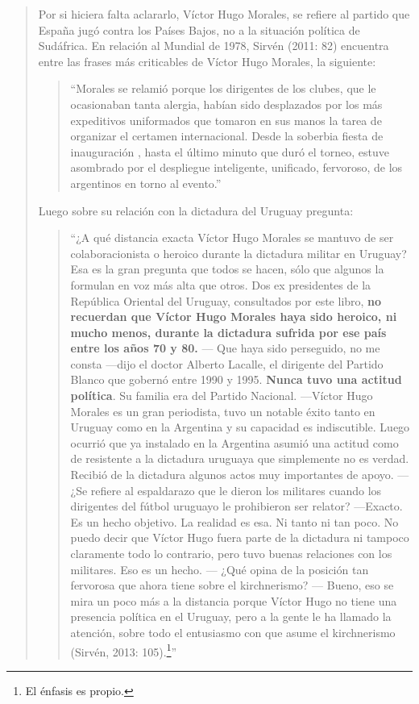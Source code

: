 \begin{quote}
Por si hiciera falta aclararlo, Víctor Hugo Morales, se refiere al partido que España jugó contra los Países Bajos, no a la situación política de Sudáfrica. En relación al Mundial de 1978, Sirvén (2011: 82) encuentra entre las frases más criticables de Víctor Hugo Morales, la siguiente:

\begin{quote}
	\enquote{Morales se relamió porque los dirigentes de los clubes, que le ocasionaban tanta alergia, habían sido desplazados por los más expeditivos uniformados que tomaron en sus manos la tarea de organizar el certamen internacional. Desde la soberbia fiesta de inauguración , hasta el último minuto que duró el torneo, estuve asombrado por el despliegue inteligente, unificado, fervoroso, de los argentinos en torno al evento.}
\end{quote}


Luego sobre su relación con la dictadura del Uruguay pregunta:

\begin{quote}
	\enquote{¿A qué distancia exacta Víctor Hugo Morales se mantuvo de ser colaboracionista o heroico durante la dictadura militar en Uruguay? Esa es la gran pregunta que todos se hacen, sólo que algunos la formulan en voz más alta que otros. Dos ex presidentes de la República Oriental del Uruguay, consultados por este libro, \textbf{no recuerdan que Víctor Hugo Morales haya sido heroico, ni mucho menos, durante la dictadura sufrida por ese país entre los años 70 y 80.} --- Que haya sido perseguido, no me consta ---dijo el doctor Alberto Lacalle, el dirigente del Partido Blanco que gobernó entre 1990 y 1995. \textbf{Nunca tuvo una actitud política}. Su familia era del Partido Nacional. ---Víctor Hugo Morales es un gran periodista, tuvo un notable éxito tanto en Uruguay como en la Argentina y su capacidad es indiscutible. Luego ocurrió que ya instalado en la Argentina asumió una actitud como de resistente a la dictadura uruguaya que simplemente no es verdad. Recibió de la dictadura algunos actos muy importantes de apoyo. --- ¿Se refiere al espaldarazo que le dieron los militares cuando los dirigentes del fútbol uruguayo le prohibieron ser relator? ---Exacto. Es un hecho objetivo. La realidad es esa. Ni tanto ni tan poco. No puedo decir que Víctor Hugo fuera parte de la dictadura ni tampoco claramente todo lo contrario, pero tuvo buenas relaciones con los militares. Eso es un hecho. --- ¿Qué opina de la posición tan fervorosa que ahora tiene sobre el kirchnerismo? --- Bueno, eso se mira un poco más a la distancia porque Víctor Hugo no tiene una presencia política en el Uruguay, pero a la gente le ha llamado la atención, sobre todo el entusiasmo con que asume el kirchnerismo (Sirvén, 2013: 105).\footnote{El énfasis es propio.}}
\end{quote}



\end{quote}

